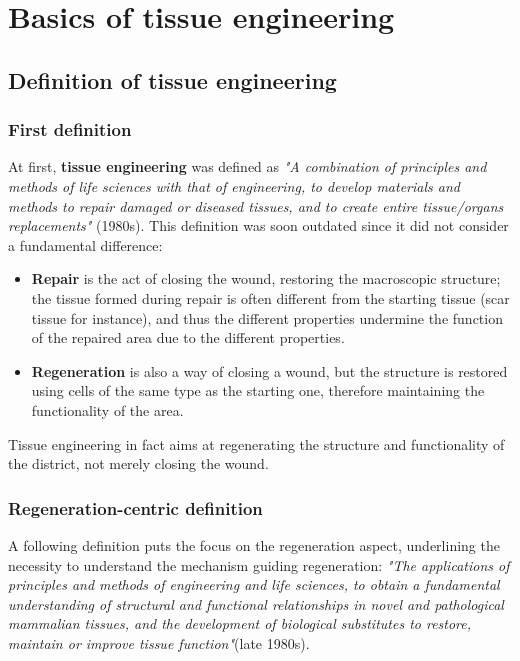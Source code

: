 \graphicspath{{chapters/01/images/}}
\chapter{Basics of tissue engineering}

\section{Definition of tissue engineering}

  \subsection{First definition}
  At first, \textbf{tissue engineering} was defined as \textit{"A combination of principles and methods of life sciences with that of engineering, to develop materials and methods to repair damaged or diseased tissues, and to create entire tissue/organs replacements"} (1980s).
  This definition was soon outdated since it did not consider a fundamental difference:

  \begin{multicols}{2}
    \begin{itemize}
      \item \textbf{Repair} is the act of closing the wound, restoring the macroscopic structure; the tissue  formed during repair is often different from the starting tissue (scar tissue for instance), and thus the different properties undermine the function of the repaired area due to the different properties.
      \item \textbf{Regeneration} is also a way of closing a wound, but the structure is restored using cells of the same type as the starting one, therefore maintaining the functionality of the area.
    \end{itemize}
  \end{multicols}

  Tissue engineering in fact aims at regenerating the structure and functionality of the district, not merely closing the wound.

  \subsection{Regeneration-centric definition}
  A following definition puts the focus on the regeneration aspect, underlining the necessity to understand the mechanism guiding regeneration: \textit{"The applications of principles and methods of engineering and life sciences, to obtain a fundamental understanding of structural and functional relationships in novel and pathological mammalian tissues, and the development of biological substitutes to restore, maintain or improve tissue function"}(late 1980s).

